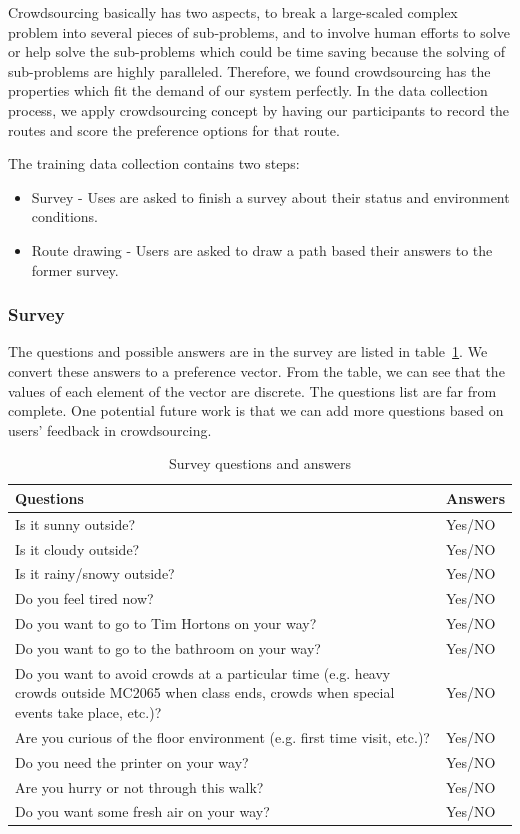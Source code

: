 \documentclass{sigchi}
\begin{document}
Crowdsourcing basically has two aspects, to break a large-scaled complex problem into several pieces of sub-problems, and to involve human efforts to solve or help solve the sub-problems which could be time saving because the solving of sub-problems are highly paralleled. Therefore, we found crowdsourcing has the properties which fit the demand of our system perfectly. In the data collection process, we apply crowdsourcing concept by having our participants to record the routes and score the preference options for that route.


The training data collection contains two steps:
\begin{itemize}
\item Survey - Uses are asked to finish a survey about their status and environment conditions.
\item Route drawing - Users are asked to draw a path based their answers to the former survey.
\end{itemize}

\subsubsection{Survey}

The questions and possible answers are in the survey are listed in table~\ref{table:survey_questions}. We convert these answers to a preference vector. From the table, we can see that the values of each element of the vector are discrete. The questions list are far from complete. One potential future work is that we can add more questions based on users’ feedback in crowdsourcing.
\begin{table}
  \centering
  \caption{Survey questions and answers}
  \label{table:survey_questions}
  \begin{tabularx}{0.5\textwidth}{|X|l|}
    \hline \hline
    Questions & Answers \\\hline
    Is it sunny outside? & Yes/NO \\\hline
    Is it cloudy outside? & Yes/NO \\\hline
    Is it rainy/snowy outside? & Yes/NO \\\hline
    Do you feel tired now? & Yes/NO \\\hline
    Do you want to go to Tim Hortons on your way? & Yes/NO \\\hline
    Do you want to go to the bathroom on your way? & Yes/NO \\\hline
    Do you want to avoid crowds at a particular time (e.g. heavy crowds outside MC2065 when class ends, crowds when special events take place, etc.)? & Yes/NO \\\hline
    Are you curious of the floor environment (e.g. first time visit, etc.)? & Yes/NO \\\hline
    Do you need the printer on your way? & Yes/NO \\\hline
    Are you hurry or not through this walk? & Yes/NO \\\hline
    Do you want some fresh air on your way? & Yes/NO \\\hline
    \hline
  \end{tabularx}
\end{table}
\end{document}
